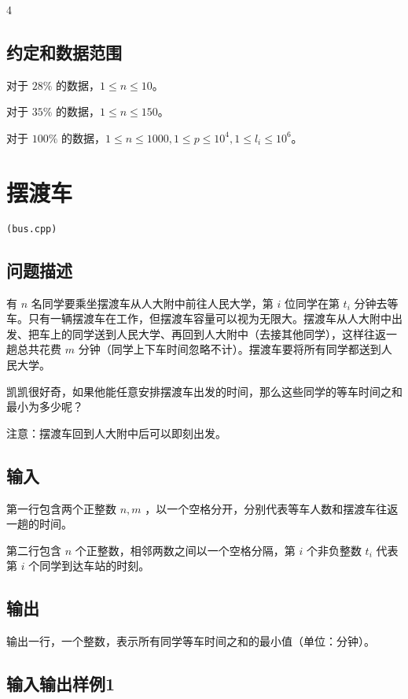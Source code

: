 \documentclass[UTF8]{ctexart}
\begin{document}
4


\subsection{约定和数据范围}

对于 $28\%$ 的数据，$1\le n \le 10$。  

对于 $35\%$ 的数据，$1\le n\le 150$。

对于 $100\%$ 的数据，$1\le n\le 1000,1\le p\le 10^4,1\le l_i\le 10^6$。

\newpage
\section{摆渡车}
\begin{center}
\tt\large{(bus.cpp)}
\end{center}
\subsection{问题描述}

有 $n$ 名同学要乘坐摆渡车从人大附中前往人民大学，第 $i$ 位同学在第 $t_i$ 分钟去等车。只有一辆摆渡车在工作，但摆渡车容量可以视为无限大。摆渡车从人大附中出发、把车上的同学送到人民大学、再回到人大附中（去接其他同学），这样往返一趟总共花费 $m$ 分钟（同学上下车时间忽略不计）。摆渡车要将所有同学都送到人民大学。

凯凯很好奇，如果他能任意安排摆渡车出发的时间，那么这些同学的等车时间之和最小为多少呢？

注意：摆渡车回到人大附中后可以即刻出发。

\subsection{输入}

第一行包含两个正整数 $n,m$ ，以一个空格分开，分别代表等车人数和摆渡车往返一趟的时间。

第二行包含 $n$ 个正整数，相邻两数之间以一个空格分隔，第 $i$ 个非负整数   $t_i$ 代表第 $i$ 个同学到达车站的时刻。

\subsection{输出}

输出一行，一个整数，表示所有同学等车时间之和的最小值（单位：分钟）。

\subsection{输入输出样例1}
\end{document}
